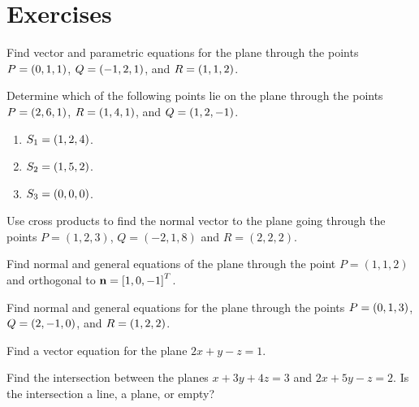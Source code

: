 \section*{Exercises}

\begin{enumialphparenastyle}


\begin{ex}
  Find vector and parametric equations for the plane through the
  points $P = \left(0,1,1\right)$, $Q = \left(-1,2,1\right)$, and $R = \left(1,1,2\right)$.
\end{ex}

\begin{ex}
  Determine which of the following points lie on the plane through the
  points $P = \left(2,6,1\right)$, $R = \left(1,4,1\right)$, and $Q = \left(1,2,-1\right)$.
  \begin{enumerate}
  \item $S_1=\left(1,2,4\right)$.
  \item $S_2=\left(1,5,2\right)$.
  \item $S_3=\left(0,0,0\right)$.
  \end{enumerate}
\end{ex}

\begin{ex}
  Use cross products to find the normal vector to the plane going
  through the points $P=(1,2,3)$, $Q=(-2,1,8)$ and $R=(2,2,2)$.
\end{ex}

\begin{ex}
  Find normal and general equations of the plane through the point
  $P=(1,1,2)$ and orthogonal to $\mbox{\bf n}=\left[1,0,-1\right]^T$.
\end{ex}

\begin{ex}
  Find normal and general equations for the plane through the points
  $P = \left(0,1,3\right)$, $Q=\left(2,-1,0\right)$, and $R=\left(1,2,2\right)$.
\end{ex}

\begin{ex}
  Find a vector equation for the plane $2x+y-z=1$.
\end{ex}

\begin{ex}
  Find the intersection between the planes $x+3y+4z=3$ and $2x+5y-z=2$.
  Is the intersection a line, a plane, or empty?
\end{ex}


\end{enumialphparenastyle}
